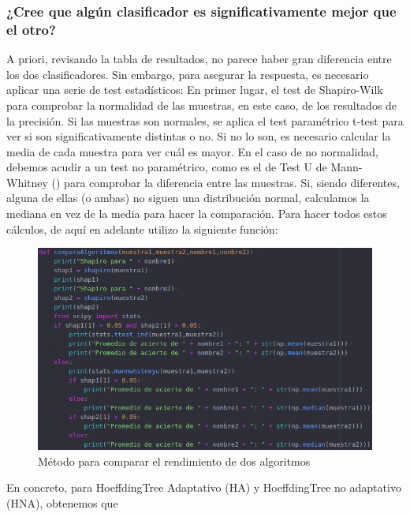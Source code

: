 \subsubsection{¿Cree que algún clasificador es significativamente mejor que el otro?}

A priori, revisando la tabla de resultados, no parece haber gran diferencia entre los dos clasificadores. Sin embargo, para asegurar la respuesta, es necesario aplicar una serie de test estadísticos: En primer lugar, el test de Shapiro-Wilk para comprobar la normalidad de las muestras, en este caso, de los resultados de la precisión. Si las muestras son normales, se aplica el test paramétrico t-test para ver si son significativamente distintas o no. Si no lo son, es necesario calcular la media de cada muestra para ver cuál es mayor. En el caso de no normalidad, debemos acudir a un test no paramétrico, como es el de Test U de Mann-Whitney (\cite{umw}) para comprobar la diferencia entre las muestras. Si, siendo diferentes, alguna de ellas (o ambas) no siguen una distribución normal, calculamos la mediana en vez de la media para hacer la comparación. Para hacer todos estos cálculos, de aquí en adelante utilizo la siguiente función:

\begin{figure}[H] %
	\centering
	\includegraphics[scale=0.45]{comparaAl.png}  %
	\caption{Método para comparar el rendimiento de dos algoritmos} 
	\label{fig:compAl}
\end{figure}

En concreto, para HoeffdingTree Adaptativo (HA) y HoeffdingTree no adaptativo (HNA), obtenemos que

